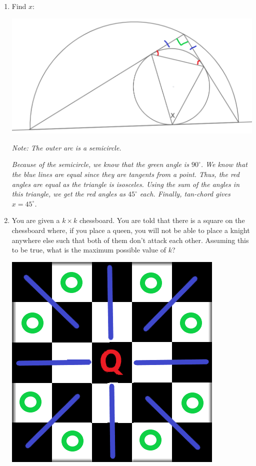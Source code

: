 \documentclass{article}
\begin{document}
\begin{enumerate}[1.]
\item %
Find $x$:
\begin{center}
\includegraphics[scale=0.4]{angle_diagram_sol.png}
\end{center}
\textit{Note: The outer arc is a semicircle.}

{\itshape Because of the semicircle, we know that the green angle is $90^{\circ}$. We know that the blue lines are equal since they are tangents from a point. Thus, the red angles are equal as the triangle is isosceles. Using the sum of the angles in this triangle, we get the red angles as $45^{\circ}$ each. Finally, tan-chord gives $x=45^{\circ}$.}


\item %
You are given a ${k\times k}$ chessboard. You are told that there is a square on the chessboard where, if you place a queen, you will not be able to place a knight anywhere else such that both of them don't attack each other. Assuming this to be true, what is the maximum possible value of $k$?

\begin{center}
\includegraphics[scale=0.5]{chess.png}
\end{center}


\end{enumerate}
\end{document}
